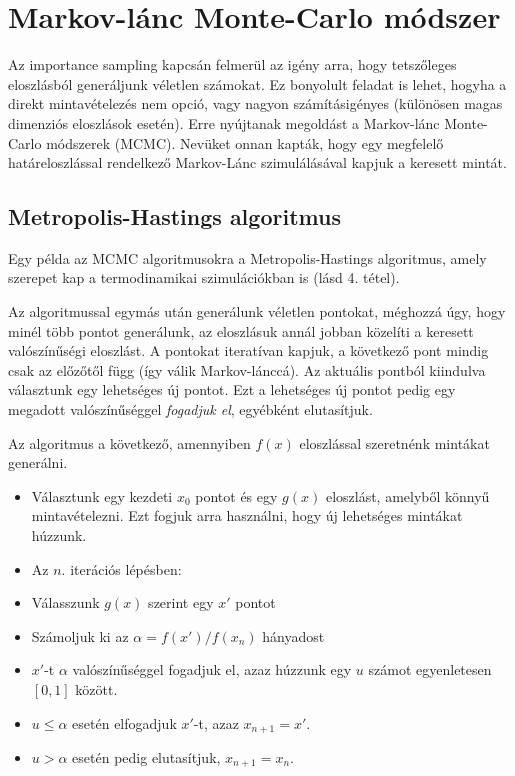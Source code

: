 \documentclass[12pt]{article}
\theoremstyle{plain}
\begin{document}
\section{Markov-lánc Monte-Carlo módszer}
Az importance sampling kapcsán felmerül az igény arra, hogy tetszőleges eloszlásból generáljunk véletlen számokat. Ez bonyolult feladat is lehet, hogyha a direkt mintavételezés nem opció, vagy nagyon számításigényes (különösen magas dimenziós eloszlások esetén). Erre nyújtanak megoldást a Markov-lánc Monte-Carlo módszerek (MCMC). Nevüket onnan kapták, hogy egy megfelelő határeloszlással rendelkező Markov-Lánc szimulálásával kapjuk a keresett mintát. 
\subsection{Metropolis-Hastings algoritmus}
Egy példa az MCMC algoritmusokra a Metropolis-Hastings algoritmus, amely szerepet kap a termodinamikai szimulációkban is (lásd 4. tétel). 

Az algoritmussal egymás után generálunk véletlen pontokat, méghozzá úgy, hogy minél több pontot generálunk, az eloszlásuk annál jobban közelíti a keresett valószínűségi eloszlást. A pontokat iteratívan kapjuk, a következő pont mindig csak az előzőtől függ (így válik Markov-lánccá). 
Az aktuális pontból kiindulva választunk egy lehetséges új pontot. Ezt a lehetséges új pontot pedig egy megadott valószínűséggel {\em fogadjuk el}, egyébként elutasítjuk. 

Az algoritmus a következő, amennyiben $f(x)$ eloszlással szeretnénk mintákat generálni.
\begin{itemize}
    \item Választunk egy kezdeti $x_0$ pontot és egy $g(x)$ eloszlást, amelyből könnyű mintavételezni. Ezt fogjuk arra használni, hogy új lehetséges mintákat húzzunk. 
    \item Az $n.$ iterációs lépésben:
    \item Válasszunk $g(x)$ szerint egy $x'$ pontot
    \item Számoljuk ki az $\alpha = f(x')/f(x_n)$ hányadost
    \item $x'$-t $\alpha$ valószínűséggel fogadjuk el, azaz húzzunk egy $u$ számot egyenletesen $[0,1]$ között. 
    \item $u\leq \alpha$  esetén elfogadjuk $x'$-t, azaz $x_{n+1} = x'$.
    \item $u > \alpha$ esetén pedig elutasítjuk, $x_{n+1} = x_n$.
\end{itemize}
\end{document}
